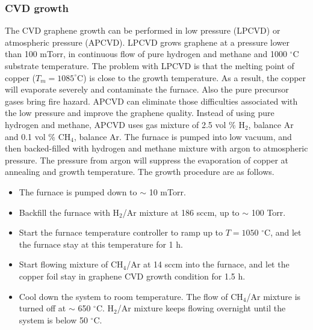 \documentclass[pdflatex, sectionletters, 12pt]{pittetd}    %
\begin{document}
\subsubsection{CVD growth}

The CVD graphene growth can be performed in low pressure (LPCVD) or atmospheric pressure (APCVD). LPCVD grows graphene at a pressure lower than 100 mTorr, in continuous flow of pure hydrogen and methane and 1000 $^{\circ}$C substrate temperature. The problem with LPCVD is that the melting point of copper ($T_m = 1085^{\circ}$C) is close to the growth temperature. As a result, the copper will evaporate severely and contaminate the furnace\cite{vlassiouk2013large}. Also the pure precursor gases bring fire hazard. APCVD can eliminate those difficulties associated with the low pressure and improve the graphene quality\cite{vlassiouk2013large, dhingra2015quadratic}. Instead of using pure hydrogen and methane, APCVD uses gas mixture of 2.5 vol \% H$_2$, balance Ar and 0.1 vol \% CH$_4$, balance Ar. The furnace is pumped into low vacuum, and then backed-filled with hydrogen and methane mixture with argon to atmospheric pressure. The pressure from argon will suppress the evaporation of copper at annealing and growth temperature. The growth procedure are as follows\cite{dhingra2015quadratic}. 

\begin{itemize}
	\item The furnace is pumped down to $\sim$ 10 mTorr.
	\item Backfill the furnace with H$_2$/Ar mixture at 186 sccm, up to $\sim$ 100 Torr.
	\item Start the furnace temperature controller to ramp up to $T = 1050$ $^{\circ}$C, and let the furnace stay at this temperature for 1 h.
	\item Start flowing mixture of CH$_4$/Ar at 14 sccm into the furnace, and let the copper foil stay in graphene CVD growth condition for 1.5 h.
	\item Cool down the system to room temperature. The flow of CH$_4$/Ar mixture is turned off at $\sim$ 650 $^{\circ}$C. H$_2$/Ar mixture keeps flowing overnight until the system is below 50 $^{\circ}$C. 
	
\end{itemize}
\end{document}
